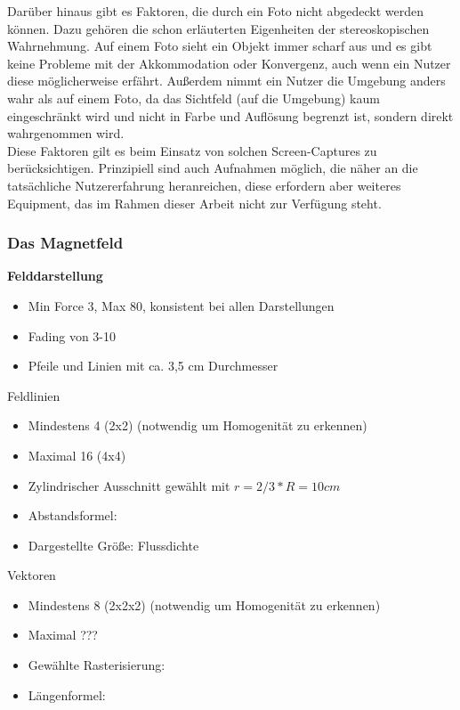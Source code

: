 Darüber hinaus gibt es Faktoren, die durch ein Foto nicht abgedeckt werden können. Dazu gehören die schon erläuterten Eigenheiten der stereoskopischen Wahrnehmung. Auf einem Foto sieht ein Objekt immer scharf aus und es gibt keine Probleme mit der Akkommodation oder Konvergenz, auch wenn ein Nutzer diese möglicherweise erfährt. Außerdem nimmt ein Nutzer die Umgebung anders wahr als auf einem Foto, da das Sichtfeld (auf die Umgebung) kaum eingeschränkt wird und nicht in Farbe und Auflösung begrenzt ist, sondern direkt wahrgenommen wird.\\

Diese Faktoren gilt es beim Einsatz von solchen Screen-Captures zu berücksichtigen. Prinzipiell sind auch Aufnahmen möglich, die näher an die tatsächliche Nutzererfahrung heranreichen, diese erfordern aber weiteres Equipment, das im Rahmen dieser Arbeit nicht zur Verfügung steht.




\subsubsection{Das Magnetfeld}

\textbf{Felddarstellung}
\begin{itemize}
	\item Min Force 3, Max 80, konsistent bei allen Darstellungen
	\item Fading von 3-10
	\item Pfeile und Linien mit ca. 3,5 cm Durchmesser
\end{itemize}
Feldlinien
\begin{itemize}
	\item Mindestens 4 (2x2) (notwendig um Homogenität zu erkennen)
	\item Maximal 16 (4x4)
	\item Zylindrischer Ausschnitt gewählt mit $r=2/3 * R = 10 cm$
	\item Abstandsformel: 
	\item Dargestellte Größe: Flussdichte
\end{itemize}
Vektoren
\begin{itemize}
	\item Mindestens 8 (2x2x2) (notwendig um Homogenität zu erkennen)
	\item Maximal ???
	\item Gewählte Rasterisierung:
	\item Längenformel:
\end{itemize}

